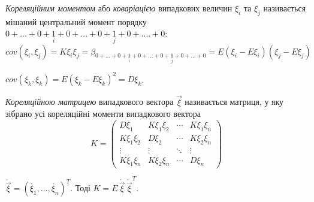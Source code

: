 \begin{definition}
    \emph{Кореляційним моментом} або 
    \emph{коваріацією} випадкових величин 
    $\xi_i$ та $\xi_j$ називається мішаний 
    центральний момент 
    порядку
    $0+...+0+\underset{i}{1}+0+...+0+\underset{j}{1}+0+....+0$:
    \begin{equation*}
        {cov}(\xi_i,\xi_j) = K\xi_i\xi_j = \beta_{0+...+0+\underset{i}{1}+0+...
        +0+\underset{j}{1}+0+...+0}
        =
        E(\xi_i-E\xi_i)(\xi_j-E\xi_j)
    \end{equation*}
\end{definition}
\begin{remark}
    ${cov}(\xi_k, \xi_k) = E(\xi_k-E\xi_k)^2 = D\xi_k$.
\end{remark}
\begin{definition}
   \emph{Кореляційною матрицею} випадкового 
   вектора $\vec{\xi}$ називається матриця, у яку зібрано усі 
   кореляційні моменти випадкового вектора
   \begin{equation*}
       K = 
       \begin{pmatrix}
           D\xi_1 & K\xi_1\xi_2 & \cdots & K\xi_1\xi_n \\
           K\xi_1\xi_2 & D\xi_2 & \cdots & K\xi_2\xi_n \\
           \vdots & \vdots & \ddots & \vdots \\
           K\xi_1\xi_n & K\xi_2\xi_n & \cdots & D\xi_n
       \end{pmatrix}
   \end{equation*} 
\end{definition}
\begin{remark}
    $\mathring{\vec{\xi}} = \left(\mathring{\xi_1}, ..., \mathring{\xi_n}
    \right)^T$.
    Тоді $K = E\,\mathring{\vec{\xi}}\,\mathring{\vec{\xi}}^T$.
\end{remark}

